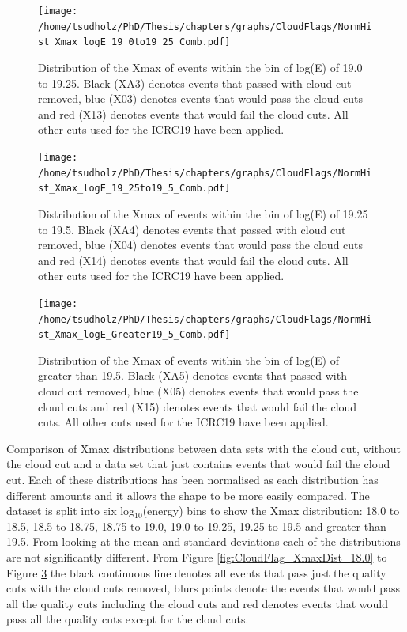 \begin{figure}[!p]
\centering
\texttt{[image: /home/tsudholz/PhD/Thesis/chapters/graphs/CloudFlags/NormHist\_Xmax\_logE\_19\_0to19\_25\_Comb.pdf]}
\caption{Distribution of the Xmax of events within the bin of log(E) of 19.0 to 19.25. Black (XA3) denotes events that passed with cloud cut removed, blue (X03) denotes events that would pass the cloud cuts and red (X13) denotes events that would fail the cloud cuts. All other cuts used for the ICRC19 have been applied.}\label{fig:CloudFlag_XmaxDist_19.0}
\end{figure}

\begin{figure}[!p]
\centering
\texttt{[image: /home/tsudholz/PhD/Thesis/chapters/graphs/CloudFlags/NormHist\_Xmax\_logE\_19\_25to19\_5\_Comb.pdf]}
\caption{Distribution of the Xmax of events within the bin of log(E) of 19.25 to 19.5. Black (XA4) denotes events that passed with cloud cut removed, blue (X04) denotes events that would pass the cloud cuts and red (X14) denotes events that would fail the cloud cuts. All other cuts used for the ICRC19 have been applied.}\label{fig:CloudFlag_XmaxDist_19.25}
\end{figure}

\begin{figure}[!p]
\centering
\texttt{[image: /home/tsudholz/PhD/Thesis/chapters/graphs/CloudFlags/NormHist\_Xmax\_logE\_Greater19\_5\_Comb.pdf]}
\caption{Distribution of the Xmax of events within the bin of log(E) of greater than 19.5. Black (XA5) denotes events that passed with cloud cut removed, blue (X05) denotes events that would pass the cloud cuts and red (X15) denotes events that would fail the cloud cuts. All other cuts used for the ICRC19 have been applied.}\label{fig:CloudFlag_XmaxDist_19.5}
\end{figure}

Comparison of Xmax distributions between data sets with the cloud cut, without the cloud cut and a data set that just contains events that would fail the cloud cut. Each of these distributions has been normalised as each distribution has different amounts and it allows the shape to be more easily compared. The dataset is split into six log$_{10}$(energy) bins to show the Xmax distribution: 18.0 to 18.5, 18.5 to 18.75, 18.75 to 19.0, 19.0 to 19.25, 19.25 to 19.5 and greater than 19.5. From looking at the mean and standard deviations each of the distributions are not significantly different. From Figure \ref{fig:CloudFlag_XmaxDist_18.0} to Figure \ref{fig:CloudFlag_XmaxDist_19.5} the black continuous line denotes all events that pass just the quality cuts with the cloud cuts removed, blurs points denote the events that would pass all the quality cuts including the cloud cuts and red denotes events that would pass all the quality cuts except for the cloud cuts.


